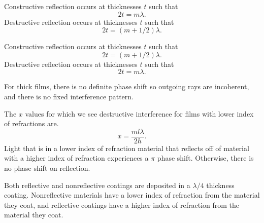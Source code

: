 \documentclass[nobib,notoc]{tufte-handout}
\begin{document}
\begin{defi}
	Constructive reflection occurs at thicknesses \(t\) such that
	\begin{equation*}
		2t=m\lambda.
	\end{equation*}
	Destructive reflection occurs at thicknesses \(t\) such that
	\begin{equation*}
		2t=(m+1/2)\lambda.
	\end{equation*}
\end{defi}
\begin{defi}
	Constructive reflection occurs at thicknesses \(t\) such that
	\begin{equation*}
		2t=(m+1/2)\lambda.
	\end{equation*}
	Destructive reflection occurs at thicknesses \(t\) such that
	\begin{equation*}
		2t=m\lambda.
	\end{equation*}
\end{defi}
\begin{rema}
	For thick films, there is no definite phase shift so outgoing rays are incoherent, and there is no fixed interference pattern.
\end{rema}
\begin{rema}
	The \(x\) values for which we see destructive interference for films with lower index of refractions are.
	\begin{equation*}
		x=\frac{ml\lambda}{2h}.
	\end{equation*}
	Light that is in a lower index of refraction material that reflects off of material with a higher index of refraction experiences a \(\pi\) phase shift. Otherwise, there is no phase shift on reflection.
\end{rema}
\begin{defi}
	Both reflective and nonreflective coatings are deposited in a \(\lambda/4\) thickness coating. Nonreflective materials have a lower index of refraction from the material they coat, and reflective coatings have a higher index of refraction from the material they coat.
\end{defi}
\end{document}
